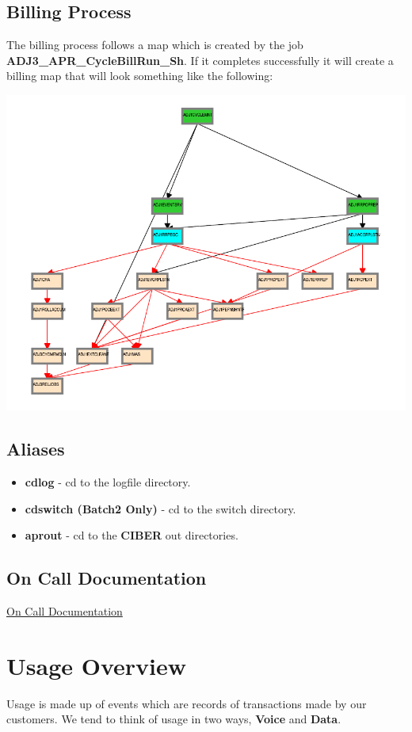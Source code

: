 \documentclass[12pt,twoside]{article}
\begin{document}
\subsection{Billing Process}
\label{sec:orgheadline17}
The billing process follows a map which is created by the job
\textbf{ADJ3\_APR\_CycleBillRun\_Sh}. If it completes successfully it
will create a billing map that will look something like the
following:

\includegraphics[width=.9\linewidth]{Pictures/billing_tc_map-27124108.png}

\subsection{Aliases}
\label{sec:orgheadline18}
\begin{itemize}
\item \textbf{cdlog} - cd to the logfile directory.
\item \textbf{cdswitch (Batch2 Only)} - cd to the switch directory.
\item \textbf{aprout} - cd to the \textbf{CIBER} out directories.
\end{itemize}
\subsection{On Call Documentation}
\label{sec:orgheadline19}
\href{docs/ON\%20CALL\%20TASKS.pdf}{On Call Documentation}
\newpage
\section{Usage Overview}
\label{sec:orgheadline32}
Usage is made up of events which are records of transactions made by our customers. We tend to think of usage
in two ways, \textbf{Voice} and \textbf{Data}.\\
\end{document}
